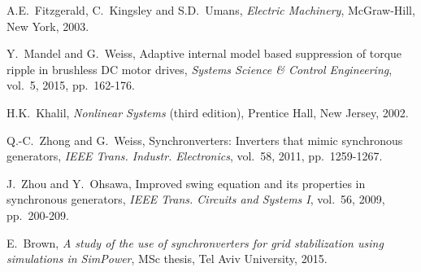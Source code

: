 \documentclass[conference]{IEEEtran}
\newcommand{\m}      {{\hbox{\hskip 1pt}}}
\begin{document}
\begin{thebibliography}{10}
 A.E.~Fitzgerald, C.~Kingsley and S.D.~Umans,
 \m {\em Electric Machinery}, \m McGraw-Hill, New York, 2003.

 Y.~Mandel and G.~Weiss, \m Adaptive internal model
 based suppression of torque ripple in brushless DC motor drives,
 {\em Systems Science \& Control Engineering}, vol.~5, 2015, 
 pp.~162-176.

 H.K.~Khalil, \m \emph{Nonlinear Systems} (third 
 edition), Prentice Hall, New Jersey, 2002.

 Q.-C.~Zhong and G.~Weiss, \m Synchronverters: 
 Inverters that mimic synchronous generators, {\em IEEE Trans. 
 Industr. Electronics}, vol.~58, 2011, pp.~1259-1267.

 J.~Zhou and Y.~Ohsawa, \m Improved swing
 equation and its properties in synchronous generators, {\em
 IEEE Trans. Circuits and Systems I}, vol.~56, 2009, pp.~200-209.
 
 E.~Brown, \m {\em A study of the use of synchronverters for grid stabilization using
simulations in SimPower}, MSc thesis, Tel Aviv University, 2015.

\end{thebibliography}
\end{document}
